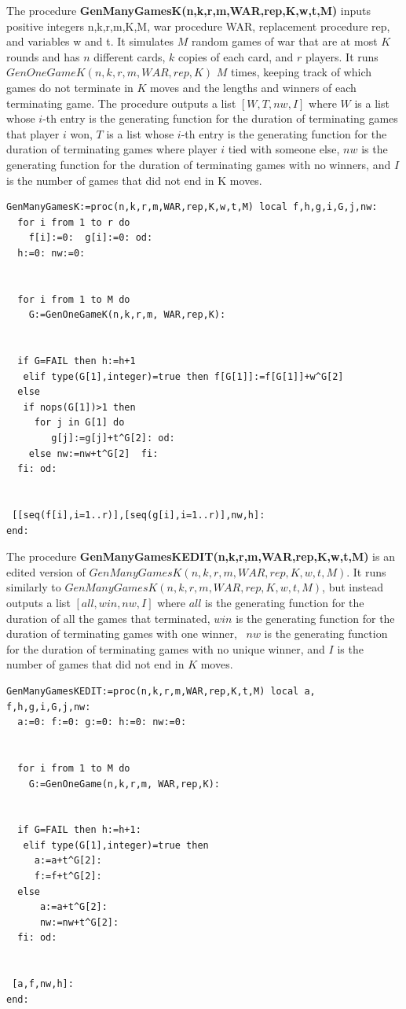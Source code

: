 \documentclass[12pt]{amsart}
\begin{document}
The procedure \textbf{GenManyGamesK(n,k,r,m,WAR,rep,K,w,t,M)} inputs positive integers n,k,r,m,K,M, war procedure WAR, replacement procedure rep, and variables w and t. It simulates $M$ random games of war that are at most $K$ rounds and has $n$ different cards, $k$ copies of each card, and $r$ players. It runs $GenOneGameK(n,k,r,m,WAR,rep,K)$ $M$ times, keeping track of which games do not terminate in $K$ moves and the lengths and winners of each terminating game. The procedure outputs a list $[W,T,nw,I]$ where $W$ is a list whose $i$-th entry is the generating function for the duration of terminating games that player $i$ won, $T$ is a list whose $i$-th entry is the generating function for the duration of terminating games where player $i$ tied with someone else, $nw$ is the generating function for the duration of terminating games with no winners, and $I$ is the number of games that did not end in K moves.


\begin{lstlisting}
GenManyGamesK:=proc(n,k,r,m,WAR,rep,K,w,t,M) local f,h,g,i,G,j,nw:
  for i from 1 to r do
    f[i]:=0:  g[i]:=0: od:
  h:=0: nw:=0:


  for i from 1 to M do
    G:=GenOneGameK(n,k,r,m, WAR,rep,K):


  if G=FAIL then h:=h+1
   elif type(G[1],integer)=true then f[G[1]]:=f[G[1]]+w^G[2]
  else
   if nops(G[1])>1 then
     for j in G[1] do
        g[j]:=g[j]+t^G[2]: od:
    else nw:=nw+t^G[2]  fi:
  fi: od:


 [[seq(f[i],i=1..r)],[seq(g[i],i=1..r)],nw,h]:
end:
\end{lstlisting}


The procedure \textbf{GenManyGamesKEDIT(n,k,r,m,WAR,rep,K,w,t,M)} is an edited version of $GenManyGamesK(n,k,r,m,WAR,rep,K,w,t,M)$. It runs similarly to $GenManyGamesK(n,k,r,m,WAR,rep,K,w,t,M)$, but instead outputs a list $[all, win,nw,I]$ where $all$ is the generating function for the duration of all the games that terminated, $win$ is the generating function for the duration of terminating games with one winner,  $nw$ is the generating function for the duration of terminating games with no unique winner, and $I$ is the number of games that did not end in $K$ moves.


\begin{lstlisting}
GenManyGamesKEDIT:=proc(n,k,r,m,WAR,rep,K,t,M) local a, f,h,g,i,G,j,nw:
  a:=0: f:=0: g:=0: h:=0: nw:=0:


  for i from 1 to M do
    G:=GenOneGame(n,k,r,m, WAR,rep,K):


  if G=FAIL then h:=h+1:
   elif type(G[1],integer)=true then
     a:=a+t^G[2]:
     f:=f+t^G[2]:
  else
      a:=a+t^G[2]:
      nw:=nw+t^G[2]: 
  fi: od:


 [a,f,nw,h]:
end:
\end{lstlisting}
\end{document}

